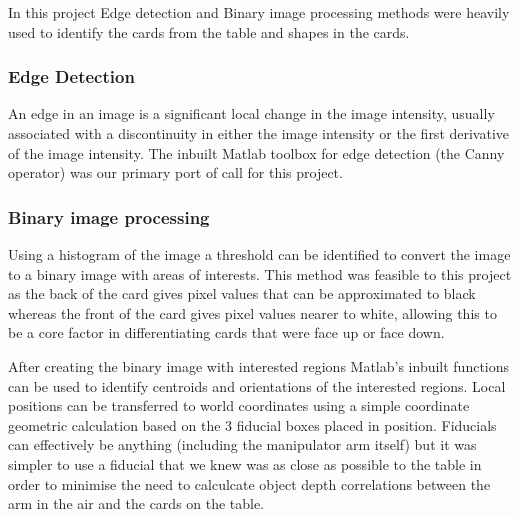 In this project Edge detection and Binary image processing methods were heavily used to identify the cards from the table and shapes in the cards.

\subsubsection{Edge Detection}
An edge in an image is a significant local change in the image intensity, usually associated with a discontinuity in either the image intensity or the first derivative of the image intensity\cite{MachineVision}. The inbuilt Matlab toolbox  for edge detection (the Canny\cite{Canny} operator) was our primary port of call for this project.

\subsubsection{Binary image processing} Using a histogram of the image a threshold can be identified to convert the image to a binary image with areas of interests. This method was feasible to this project as the back of the card gives pixel values that can be approximated to black whereas the front of the card gives pixel values nearer to white, allowing this to be a core factor in differentiating cards that were face up or face down. 

After creating the binary image with interested regions Matlab's inbuilt functions can be used to identify centroids and orientations of the interested regions. Local positions can be transferred to world coordinates using a simple coordinate geometric calculation based on the 3 fiducial boxes placed in position. Fiducials can effectively be anything (including the manipulator arm itself) but it was simpler to use a fiducial that we knew was as close as possible to the table in order to minimise the need to calculcate object depth correlations between the arm in the air and the cards on the table.
